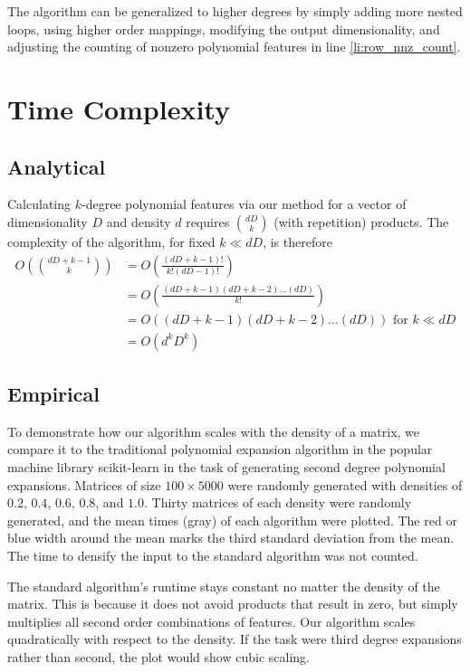 \documentclass{article} %
\begin{document}
The algorithm can be generalized to higher degrees by simply adding more nested loops, using higher order mappings, modifying the output dimensionality, and adjusting the counting of nonzero polynomial features in line \ref{li:row_nnz_count}.

\section{Time Complexity}
\subsection{Analytical}

Calculating $k$-degree polynomial features via our method for a vector of dimensionality $D$ and density $d$ requires $\binom{dD}{k}$ (with repetition) products.
The complexity of the algorithm, for fixed $k \ll dD$, is therefore
\begin{align}
O\left(\binom{dD+k-1}{k}\right) & = O\left(\frac{(dD+k-1)!}{k!(dD-1)!}\right)\\
& = O\left(\frac{(dD+k-1)(dD+k-2) \dots (dD)}{k!}\right)\\
& = O\left((dD+k-1)(dD+k-2) \dots (dD)\right) \mbox{ for } k \ll dD\\
& = O\left(d^kD^k\right)
\end{align}

\subsection{Empirical}
To demonstrate how our algorithm scales with the density of a matrix, we compare it to the traditional polynomial expansion algorithm in the popular machine library scikit-learn \cite{scikit-learn} in the task of generating second degree polynomial expansions.
Matrices of size $100 \times 5000$ were randomly generated with densities of $0.2$, $0.4$, $0.6$, $0.8$, and $1.0$.
Thirty matrices of each density were randomly generated, and the mean times (gray) of each algorithm were plotted.
The red or blue width around the mean marks the third standard deviation from the mean.
The time to densify the input to the standard algorithm was not counted.

The standard algorithm's runtime stays constant no matter the density of the matrix.
This is because it does not avoid products that result in zero, but simply multiplies all second order combinations of features.
Our algorithm scales quadratically with respect to the density.
If the task were third degree expansions rather than second, the plot would show cubic scaling.
\end{document}
